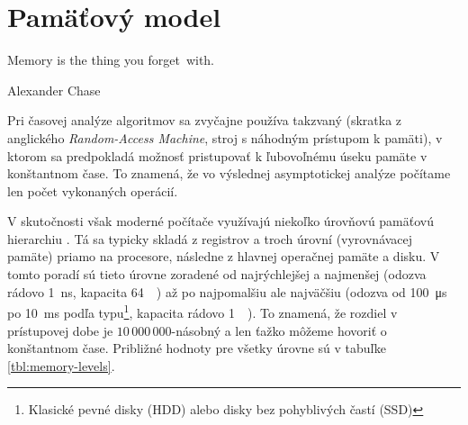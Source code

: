 \chapter{Pamäťový model}
\epigraph{Memory is the thing you forget~with.}{Alexander Chase}

Pri časovej analýze algoritmov sa zvyčajne používa takzvaný \RAM {}(skratka z anglického \emph{Random-Access Machine}, stroj s náhodným prístupom k pamäti), v ktorom sa predpokladá možnosť pristupovať k ľubovoľnému úseku pamäte v konštantnom čase. To znamená, že vo výslednej asymptotickej analýze počítame len počet vykonaných operácií.

V skutočnosti však moderné počítače využívajú niekoľko úrovňovú pamäťovú hierarchiu \citep{drepper2007every}. Tá sa typicky skladá z registrov a troch úrovní \cache (vyrovnávacej pamäte) priamo na procesore, následne z hlavnej operačnej pamäte a disku. V tomto poradí sú tieto úrovne zoradené od najrýchlejšej a najmenšej (odozva rádovo \SI{1}{\nano\second}, kapacita \SI{64}{\kibi\byte}) až po najpomalšiu ale najväčšiu (odozva od \SI{100}{\micro\second} po \SI{10}{\milli\second} podľa typu\footnote{Klasické pevné disky (HDD) alebo disky bez pohyblivých častí (SSD)}, kapacita rádovo \SI{1}{\tebi\byte}). To znamená, že rozdiel v prístupovej dobe je $10\,000\,000$-násobný a len ťažko môžeme hovoriť o konštantnom čase. Približné hodnoty pre všetky úrovne sú v tabuľke \ref{tbl:memory-levels}.

